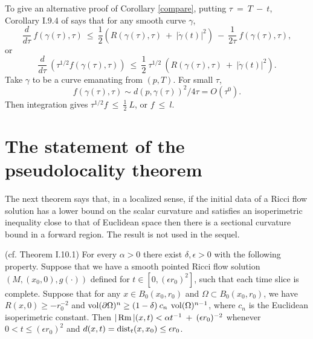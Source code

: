 \begin{remark}
  \label{rem:kl-perelman-s-differential-harnack-inequality-structural-remark-harnack-inequalities}

To give an alternative proof of Corollary \ref{compare}, putting $\tau \: = \: T \: - \: t$,
Corollary I.9.4 of \cite{Perelman} says that for any smooth curve $\gamma$,
\begin{equation}
\frac{d}{d\tau} \: f(\gamma(\tau), \tau) \: \le \:
\frac{1}{2} \left( R(\gamma(\tau), \tau) \: + \: \big| \dot{\gamma}(t)
\big|^2 \right) \: - \: \frac{1}{2\tau} \: f(\gamma(\tau), \tau),
\end{equation}
or
\begin{equation}
\frac{d}{d\tau} \: \left( \tau^{1/2} f(\gamma(\tau), \tau) \right) \: \le \:
\frac{1}{2} \: \tau^{1/2} \:
\left( R(\gamma(\tau), \tau) \: + \: \big| \dot{\gamma}(t)
\big|^2 \right).
\end{equation}
Take $\gamma$ to be a curve emanating from
$(p, T)$.
For small $\tau$,
\begin{equation}
f(\gamma(\tau), \tau) \sim d(p, \gamma(\tau))^2/4\tau =
O(\tau^0).
\end{equation}
Then
integration gives $\tau^{1/2} f \: \le \: \frac12 \: L$, or $f \: \le \: l$.
\end{remark}

\section{The statement of the pseudolocality theorem}
\label{statement of I.10.1}

The next theorem says that, in a localized sense, if the initial
data of a Ricci flow solution
has a lower bound on the scalar curvature and satisfies
an isoperimetric inequality close to that of Euclidean space
then there is a sectional curvature bound in a forward region.
The result is not used in the sequel.

\begin{theorem}
  \label{thm:kl-statement-pseudolocality-theorem-pseudolocality-theorem}
 (cf. Theorem I.10.1) \label{thmI.10.1}
For every $\alpha > 0$ there exist $\delta,\epsilon > 0$ with the
following property.  Suppose that we have a
smooth
pointed Ricci flow solution
$(M, (x_0, 0), g(\cdot))$
defined for $t \in [0, (\epsilon r_0)^2]$,
such that each time slice
is complete.
Suppose that
for any $x \in B_0(x_0, r_0)$ and $\Omega \subset B_0(x_0, r_0)$,
we have $R(x,0) \ge - r_0^{-2}$ and $\operatorname{vol}(\partial \Omega)^n
\ge (1-\delta) \: c_n \: \operatorname{vol}(\Omega)^{n-1}$, where $c_n$ is the
Euclidean isoperimetric constant.  Then
$|\operatorname{Rm}|(x,t) <
\alpha t^{-1} \: + \: (\epsilon r_0)^{-2}$
 whenever
$0 < t \le (\epsilon r_0)^2$ and
$d(x,t) = \operatorname{dist}_t(x, x_0) \le
\epsilon r_0$.
\end{theorem}

